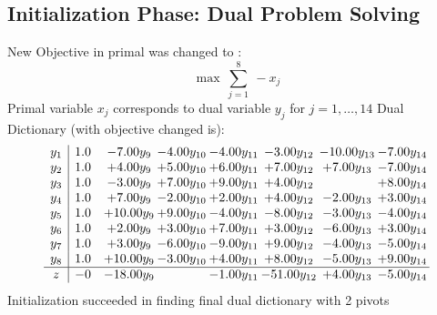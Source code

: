 \documentclass[9pt]{article}
\begin{document}
\subsection{Initialization Phase: Dual Problem Solving}
New Objective in primal was changed to : \[ \max\ \sum_{j=1}^{8}\ - x_j \] 
Primal variable $x_j$ corresponds to dual variable $y_j$ for $j = 1,\ldots,14$
Dual Dictionary (with objective changed is): 
\[\begin{array}{c| c c@{\hskip 2pt} c@{\hskip 2pt} c@{\hskip 2pt} c@{\hskip 2pt} c@{\hskip 2pt} c@{\hskip 2pt} }
 y_{1}   &  1.0 & -7.00 y_{9} & -4.00 y_{10} & -4.00 y_{11} & -3.00 y_{12} & -10.00 y_{13} & -7.00 y_{14}\\
 y_{2}   &  1.0 & +  4.00 y_{9} & +  5.00 y_{10} & +  6.00 y_{11} & +  7.00 y_{12} & +  7.00 y_{13} & -7.00 y_{14}\\
 y_{3}   &  1.0 & -3.00 y_{9} & +  7.00 y_{10} & +  9.00 y_{11} & +  4.00 y_{12} &   & +  8.00 y_{14}\\
 y_{4}   &  1.0 & +  7.00 y_{9} & -2.00 y_{10} & +  2.00 y_{11} & +  4.00 y_{12} & -2.00 y_{13} & +  3.00 y_{14}\\
 y_{5}   &  1.0 & + 10.00 y_{9} & +  9.00 y_{10} & -4.00 y_{11} & -8.00 y_{12} & -3.00 y_{13} & -4.00 y_{14}\\
 y_{6}   &  1.0 & +  2.00 y_{9} & +  3.00 y_{10} & +  7.00 y_{11} & +  3.00 y_{12} & -6.00 y_{13} & +  3.00 y_{14}\\
 y_{7}   &  1.0 & +  3.00 y_{9} & -6.00 y_{10} & -9.00 y_{11} & +  9.00 y_{12} & -4.00 y_{13} & -5.00 y_{14}\\
 y_{8}   &  1.0 & + 10.00 y_{9} & -3.00 y_{10} & +  4.00 y_{11} & +  8.00 y_{12} & -5.00 y_{13} & +  9.00 y_{14}\\
\hline
z    &  -0 & -18.00 y_{9} &   & -1.00 y_{11} & -51.00 y_{12} & +  4.00 y_{13} & -5.00 y_{14}\\
\end{array}\]
Initialization succeeded in finding final dual dictionary with 2 pivots
\end{document}

